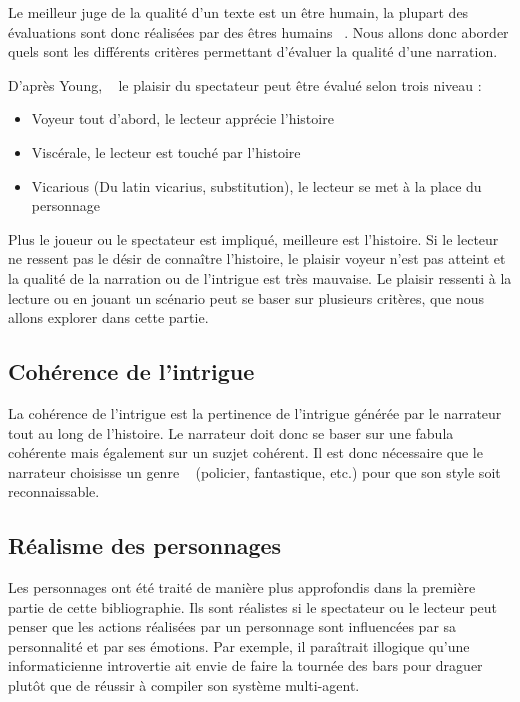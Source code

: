 \documentclass[asi]{picINSA}
\begin{document}
Le meilleur juge de la qualité d'un texte est un être humain, la plupart des évaluations sont donc réalisées par des êtres humains ~\cite{Callaway2002213}. Nous allons donc aborder quels sont les différents critères permettant d'évaluer la qualité d'une narration.

D'après Young, ~\cite{young2004architecture} le plaisir du spectateur peut être évalué selon trois niveau :
\begin{itemize}
\item Voyeur tout d'abord, le lecteur apprécie l'histoire
\item Viscérale, le lecteur est touché par l'histoire
\item Vicarious (Du latin vicarius, substitution), le lecteur se met à la place du personnage \\
\end{itemize}

Plus le joueur ou le spectateur est impliqué, meilleure est l'histoire. Si le lecteur ne ressent pas le désir de connaître l'histoire, le plaisir voyeur n'est pas atteint et la qualité de la narration ou de l'intrigue est très mauvaise. Le plaisir ressenti à la lecture ou en jouant un scénario peut se baser sur plusieurs critères, que nous allons explorer dans cette partie.

\subsection{Cohérence de l'intrigue}

La cohérence de l'intrigue est la pertinence de l'intrigue générée par le narrateur tout au long de l'histoire. Le narrateur doit donc se baser sur une fabula cohérente mais également sur un suzjet cohérent. Il est donc nécessaire que le narrateur choisisse un genre ~\cite{Ciarlini:2010:ERP:1658866.1658874} (policier, fantastique, etc.) pour que son style soit reconnaissable.

\subsection{Réalisme des personnages}

Les personnages ont été traité de manière plus approfondis dans la première partie de cette bibliographie. Ils sont réalistes si le spectateur ou le lecteur peut penser que les actions réalisées par un personnage sont influencées par sa personnalité et par ses émotions. Par exemple, il paraîtrait illogique qu'une informaticienne introvertie ait envie de faire la tournée des bars pour draguer plutôt que de réussir à compiler son système multi-agent. \\
\end{document}
